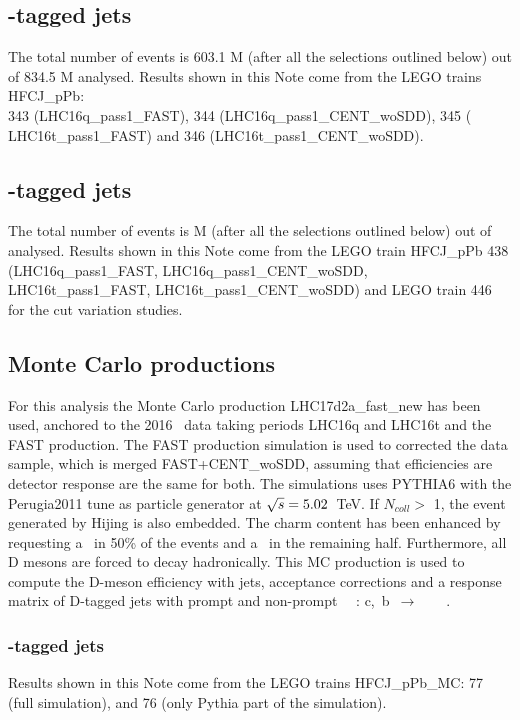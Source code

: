 \subsection{\Dstar-tagged jets}

The total number of events is 603.1 M (after all the selections outlined below) out of 834.5 M analysed.
Results shown in this Note come from the LEGO trains HFCJ\_pPb: \\343 (LHC16q\_pass1\_FAST), 344 (LHC16q\_pass1\_CENT\_woSDD), 345 ( LHC16t\_pass1\_FAST) and 346 (LHC16t\_pass1\_CENT\_woSDD).

\subsection{\Dzero-tagged jets}

The total number of events is  M (after all the selections outlined below) out of  analysed.
Results shown in this Note come from the LEGO train HFCJ\_pPb 438 (LHC16q\_pass1\_FAST, LHC16q\_pass1\_CENT\_woSDD, LHC16t\_pass1\_FAST, LHC16t\_pass1\_CENT\_woSDD) and LEGO train 446 for the cut variation studies.

\subsection{Monte Carlo productions}

For this analysis the Monte Carlo production LHC17d2a\_fast\_new has been used, anchored to the 2016 \pPb\ data taking periods LHC16q and LHC16t and the FAST production. The FAST production simulation is used to corrected the data sample, which is merged FAST+CENT\_woSDD, assuming that efficiencies are detector response are the same for both.
The simulations uses PYTHIA6 with the Perugia2011 tune as particle generator at $\sqrt{s}=5.02$~TeV. If $N_{coll} > $ 1, the event generated by Hijing is also embedded.
The charm content has been enhanced by requesting a \ccbar\ in 50\% of the events and a \bbbar\ in the remaining half.
Furthermore, all D mesons are forced to decay hadronically.
This MC production is used to compute the D-meson efficiency with jets, acceptance corrections and a response matrix of D-tagged jets with prompt and non-prompt \Dstar\ \Dzero\ : c,~b~$\rightarrow$~\Dstar\ ~\Dzero\ .

\subsubsection{\Dstar-tagged jets}
Results shown in this Note come from the LEGO trains HFCJ\_pPb\_MC: 77 (full simulation), and 76 (only Pythia part of the simulation).

